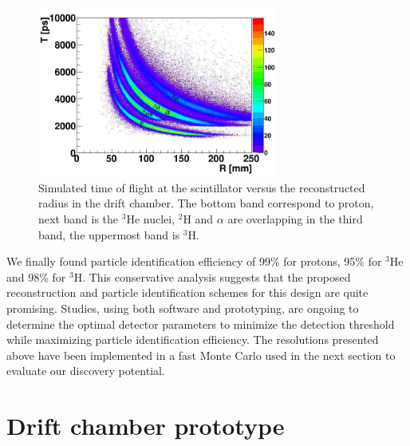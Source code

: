 \begin{figure}[ht!]
    \begin{center}
        \includegraphics[width=0.7\textwidth]{./../Detector/fig-chap2/Bare_3atm_1atm_RvsTime_named}
        \caption{Simulated time of flight at the scintillator versus the reconstructed radius in the drift chamber. The bottom band correspond to proton, next band is the $^3$He nuclei, $^2$H and $\alpha$ are overlapping in the third band, the uppermost band is $^3$H.\label{fig:SIMtof}}
    \end{center}
\end{figure}


We finally found particle identification efficiency of 99\% for protons, 95\% 
for $^3$He and 98\% for $^3$H. This conservative analysis suggests that the 
proposed reconstruction and particle identification schemes for this design are 
quite promising. Studies, using both software and prototyping, are ongoing to 
determine the optimal detector parameters to minimize the detection threshold 
while maximizing particle identification efficiency. The resolutions presented 
above have been implemented in a fast Monte Carlo used in the next section to 
evaluate our discovery potential.

\section{Drift chamber prototype}


